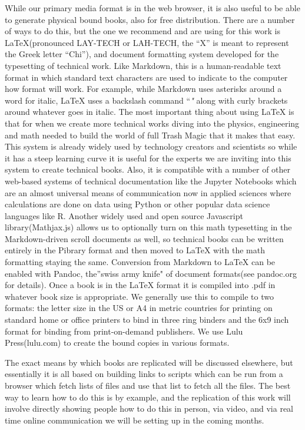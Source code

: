 While our primary media format is in the web browser, it is also useful
to be able to generate physical bound books, also for free distribution.
There are a number of ways to do this, but the one we recommend and are
using for this work is LaTeX(pronounced LAY-TECH or LAH-TECH, the ``X''
is meant to represent the Greek letter ``Chi''), and document formatting
system developed for the typesetting of technical work. Like Markdown,
this is a human-readable text format in which standard text characters
are used to indicate to the computer how format will work. For example,
while Markdown uses asterisks around a word for italic, LaTeX uses a
backslash command ``\emph" along with curly brackets around whatever
goes in italic. The most important thing about using LaTeX is that for
when we create more technical works diving into the physics, engineering
and math needed to build the world of full Trash Magic that it makes
that easy. This system is already widely used by technology creators and
scientists so while it has a steep learning curve it is useful for the
experts we are inviting into this system to create technical books.
Also, it is compatible with a number of other web-based systems of
technical documentation like the Jupyter Notebooks which are an almost
universal means of communication now in applied sciences where
calculations are done on data using Python or other popular data science
languages like R. Another widely used and open source Javascript
library(Mathjax.js) allows us to optionally turn on this math
typesetting in the Markdown-driven scroll documents as well, so
technical books can be written entirely in the Pibrary format and then
moved to LaTeX with the math formatting staying the same. Conversion
from Markdown to LaTeX can be enabled with Pandoc, the''swiss army
knife" of document formats(see pandoc.org for details). Once a book is
in the LaTeX format it is compiled into .pdf in whatever book size is
appropriate. We generally use this to compile to two formats: the letter
size in the US or A4 in metric countries for printing on standard home
or office printers to bind in three ring binders and the 6x9 inch format
for binding from print-on-demand publishers. We use Lulu Press(lulu.com)
to create the bound copies in various formats.

The exact means by which books are replicated will be discussed
elsewhere, but essentially it is all based on building links to scripts
which can be run from a browser which fetch lists of files and use that
list to fetch all the files. The best way to learn how to do this is by
example, and the replication of this work will involve directly showing
people how to do this in person, via video, and via real time online
communication we will be setting up in the coming months.

